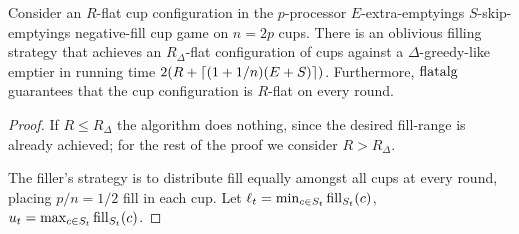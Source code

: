 \begin{lemma}
  \label{lem:flatalg}
  Consider an $R$-flat cup configuration in the $p$-processor
  $E$-extra-emptyings $S$-skip-emptyings negative-fill cup game on $n =
  2p$ cups. There is an oblivious filling strategy
   that achieves an $R_\Delta$-flat
  configuration of cups against a $\Delta$-greedy-like emptier in
  running time $2(R + \left\lceil (1+1/n)(E + S) \right\rceil)$. Furthermore,
  $\operatorname{\text{\textup{flatalg}}}$ guarantees that the cup configuration is $R$-flat on every round.
\end{lemma}
\begin{proof}
  If $R \le R_\Delta$ the algorithm does nothing, since the
  desired fill-range is already achieved; for
  the rest of the proof we consider $R > R_\Delta$.

  The filler's strategy is to distribute fill equally amongst all
  cups at every round, placing $p/n = 1/2$ fill in each cup. 
  Let $\ell_t = \min_{c\in S_t} \operatorname{\text{\textup{fill}}}_{S_t}(c)$, $u_t = \max_{c\in S_t} \operatorname{\text{\textup{fill}}}_{S_t}(c)$. 


\end{proof}
